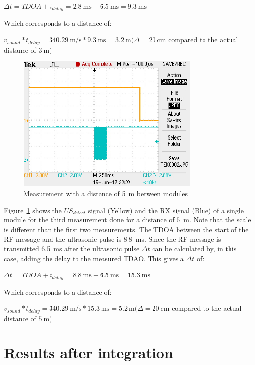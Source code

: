 $ \Delta t = TDOA + t_{delay}  = \SI{2.8}{\milli\second} + \SI{6.5}{\milli\second} = \SI{9.3}{\milli\second} $

Which corresponds to a distance of:

$ v_{sound} * t_{delay} = \SI{340.29}{\meter\per\second} * \SI{9.3}{\milli\second} = \SI{3.2}{\meter} (\Delta = \SI{20}{\centi\meter} $ compared to the actual distance of $\SI{3}{\meter})$

\begin{figure}[H]
\centering
\includegraphics[width=0.8\textwidth]{Figures/test_5m.JPG}
\caption{Measurement with a distance of \SI{5}{\meter} between modules}
\label{fig:mes_5}
\end{figure}

Figure~\ref{fig:mes_5} shows the $US_{detect}$ signal (Yellow) and the RX signal (Blue) of a single module for the third measurement done for a distance of \SI{5}{\meter}.
Note that the scale is different than the first two measurements.
The TDOA between the start of the RF message and the ultrasonic pulse is \SI{8.8}{\milli\second}.
Since the RF message is transmitted \SI{6.5}{\milli\second} after the ultrasonic pulse $\Delta t$ can be calculated by, in this case, adding the delay to the measured TDAO.
This gives a $\Delta t$ of:

$ \Delta t = TDOA + t_{delay}  = \SI{8.8}{\milli\second} + \SI{6.5}{\milli\second} = \SI{15.3}{\milli\second} $

Which corresponds to a distance of:

$ v_{sound} * t_{delay} = \SI{340.29}{\meter\per\second} * \SI{15.3}{\milli\second} = \SI{5.2}{\meter} (\Delta = \SI{20}{\centi\meter} $ compared to the actual distance of $\SI{5}{\meter})$

\section{Results after integration}

